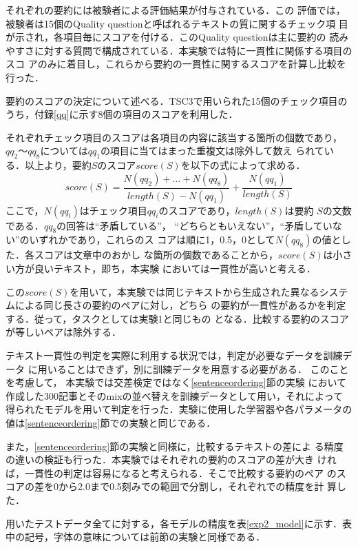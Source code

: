 \documentclass[japanese]{jnlp_1.4}
\begin{document}
 それぞれの要約には被験者による評価結果が付与されている．この
 評価では，被験者は15個のQuality questionと呼ばれるテキストの質に関するチェック項
 目\cite{hirao2004}が示され，各項目毎にスコアを付ける．このQuality questionは主に要約の
 読みやすさに対する質問で構成されている．本実験では特に一貫性に関係する項目のスコ
 アのみに着目し，これらから要約の一貫性に関するスコアを計算し比較を行った．

 要約のスコアの決定について述べる．TSC3で用いられた15個のチェック項目の
 うち，付録\ref{qq}に示す8個の項目のスコアを利用した．

 それぞれチェック項目のスコアは各項目の内容に該当する箇所の個数であり，$qq_2$〜$qq_8$については$qq_1$の項目に当てはまった重複文は除外して数え
 られている．以上より，要約$S$のスコア$score(S)$を以下の式によって求める．
 \begin{equation}
  score(S)=\frac{N(qq_2)+\dots +N(qq_8)}{length(S)-N(qq_1)}+\frac{N(qq_1)}{length(S)}
 \end{equation}
 ここで，$N(qq_i)$はチェック項目$qq_i$のスコアであり，$length(S)$は要約
 $S$の文数である．$qq_8$の回答は``矛盾している''，
 ``どちらともいえない''，``矛盾していない''のいずれかであり，これらのス
 コアは順に1，0.5，0として$N(qq_8)$の値とした．各スコアは文章中のおかし
 な箇所の個数であることから，$score(S)$は小さい方が良いテキスト，即ち，本実験
 においては一貫性が高いと考える．

 この$score(S)$を用いて，本実験では同じテキストから生成された異なるシステムによる同じ長さの要約のペアに対し，どちら
 の要約が一貫性があるかを判定する．従って，タスクとしては実験1と同じもの
 となる．比較する要約のスコアが等しいペアは除外する．

 テキスト一貫性の判定を実際に利用する状況では，判定が必要なデータを訓練データ
 に用いることはできず，別に訓練データを用意する必要がある．
 このことを考慮して，
 本実験では交差検定ではなく\ref{sentenceordering}節の実験
 において作成した300記事とそのmixの並べ替えを訓練データとして用い，それによって
 得られたモデルを用いて判定を行った．実験に使用した学習器や各パラメータの
 値は\ref{sentenceordering}節での実験と同じである．

 また，\ref{sentenceordering}節の実験と同様に，比較するテキストの差によ
 る精度の違いの検証も行った．本実験ではそれぞれの要約のスコアの差が大き
 ければ，一貫性の判定は容易になると考えられる．そこで比較する要約のペア
 のスコアの差を0から2.0まで0.5刻みでの範囲で分割し，それぞれでの精度を計
 算した．


 用いたテストデータ全てに対する，各モデルの精度を表\ref{exp2_model}に示す．表
 中の記号，字体の意味については前節の実験と同様である．
\end{document}
